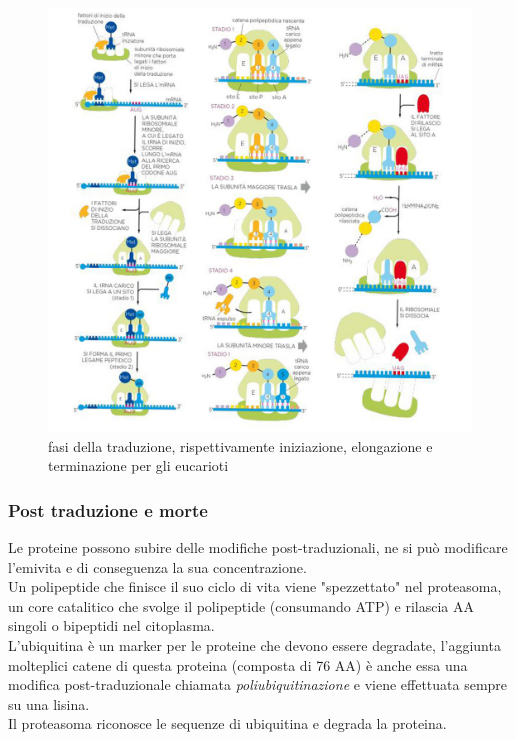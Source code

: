        \begin{figure}[h]
                \centering
                \includegraphics[width=1\textwidth]{images/traduzione.jpg}
                \caption{\small fasi della traduzione, rispettivamente iniziazione, elongazione e terminazione per gli eucarioti}
                \label{fig:mesh1}
        \end{figure}
        
        \subsubsection{Post traduzione e morte}
            Le proteine possono subire delle modifiche post-traduzionali, ne si può modificare l'emivita e di conseguenza la sua concentrazione. \\
            Un polipeptide che finisce il suo ciclo di vita viene "spezzettato" nel proteasoma, un core catalitico che svolge il polipeptide (consumando ATP) e rilascia AA singoli o bipeptidi nel citoplasma.\\
            L'ubiquitina è un marker per le proteine che devono essere degradate, l'aggiunta molteplici catene di questa proteina (composta di 76 AA) è anche essa una modifica post-traduzionale chiamata \textit{poliubiquitinazione} e viene effettuata sempre su una lisina.\\
            Il proteasoma riconosce le sequenze di ubiquitina e degrada la proteina.\\ 

\pagebreak